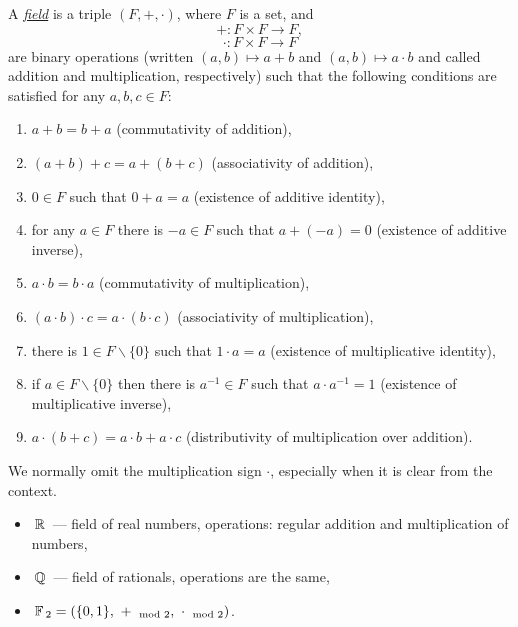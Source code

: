 \begin{definition}
A \underline{\it field} is a triple $(F,+, \cdot)$, where $F$ is a set, and 
$$+\colon F \times F \rightarrow F,$$
$$\cdot\colon F \times F \rightarrow F$$
are binary operations (written $(a, b) \mapsto a+b$ and $(a, b) \mapsto a \cdot b$ and called addition and multiplication, respectively) such that the following conditions are satisfied for any $a, b, c \in F$:
\begin{enumerate}
    \item $a+b = b+a$ (commutativity of addition),
    \item $(a+b)+c = a+(b+c)$ (associativity of addition),
    \item $0 \in F$ such that $0+a=a$ (existence of additive identity),
    \item for any $a \in F$ there is $-a \in F$ such that $a+(-a)=0$ (existence of additive inverse),
    \item $a \cdot b=b \cdot a$ (commutativity of multiplication),
    \item $(a \cdot b) \cdot c =a \cdot(b \cdot c)$ (associativity of multiplication),
    \item there is $1 \in F \backslash\{0\}$ such that $1 \cdot a=a$ (existence of multiplicative identity),
    \item if $a \in F \backslash\{0\}$ then there is $a^{-1} \in F$ such that $a \cdot a^{-1}=1$ (existence of multiplicative inverse), 
    \item $a\cdot(b+c) =a\cdot b+a\cdot c$ (distributivity of multiplication over addition).
\end{enumerate}
\end{definition}

\begin{remark}
We normally omit the multiplication sign $\cdot$, especially when it is clear from the context.
\end{remark}

\begin{example}
    \begin{itemize}
        \item[a) ] $\,\mathbb{R}\,$ --- field of real numbers, operations: regular addition and multiplication of numbers,
        \item[b) ] $\,\mathbb{Q}\,$ --- field of rationals, operations are the same,
        \item[c) ] $\,\mathbb{F}\,_2 = (\{0, 1\},~ +_{\mod 2},~ \cdot_{\mod 2})$.
    \end{itemize}
\end{example}

